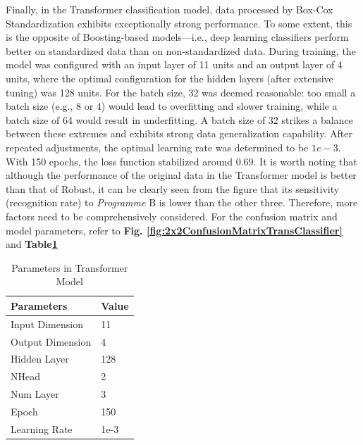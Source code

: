 \documentclass[conference]{IEEEtran}
\begin{document}
Finally, in the Transformer classification model, data processed by Box-Cox Standardization exhibits exceptionally strong performance. To some extent, this is the opposite of Boosting-based models—i.e., deep learning classifiers perform better on standardized data than on non-standardized data. During training, the model was configured with an input layer of 11 units and an output layer of 4 units, where the optimal configuration for the hidden layers (after extensive tuning) was 128 units. For the batch size, 32 was deemed reasonable: too small a batch size (e.g., 8 or 4) would lead to overfitting and slower training, while a batch size of 64 would result in underfitting. A batch size of 32 strikes a balance between these extremes and exhibits strong data generalization capability. After repeated adjustments, the optimal learning rate was determined to be $1e-3$. With 150 epochs, the loss function stabilized around 0.69. 
It is worth noting that although the performance of the original data in the Transformer model is better than that of Robust, it can be clearly seen from the figure that its sensitivity (recognition rate) to \textit{Programme} B is lower than the other three. Therefore, more factors need to be comprehensively considered. 
For the confusion matrix and model parameters, refer to \textbf{Fig. \ref{fig:2x2ConfusionMatrixTransClassifier}} and \textbf{Table\ref{tab:TransPara}}
\begin{table}[h!]
    \centering
    \caption{Parameters in Transformer Model}
    \begin{tabular}{ll}
        \toprule
        \textbf{Parameters} & \textbf{Value} \\
        \midrule
        Input Dimension & 11\\
        Output Dimension & 4\\
        Hidden Layer & 128\\
        NHead &2\\
        Num Layer & 3\\
        Epoch & 150 \\
        Learning Rate & 1e-3\\
        \bottomrule
    \end{tabular}
    \label{tab:TransPara}
\end{table}
\end{document}
